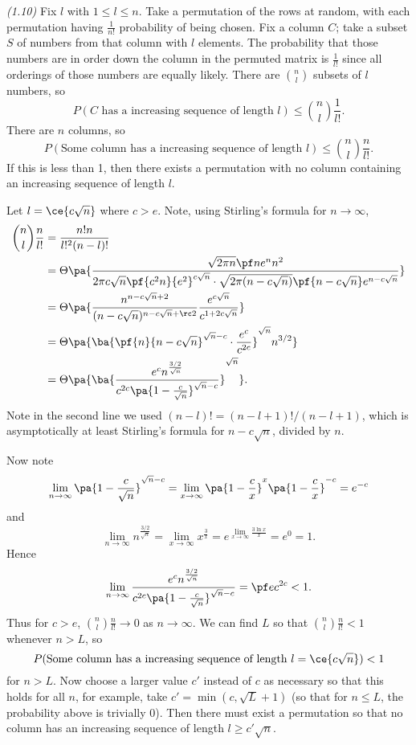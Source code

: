 \begin{problem} {\it (1.10)}
Fix $l$ with $1\leq l\leq n$. Take a permutation of the rows at random, with each permutation having $\frac{1}{n!}$ probability of being chosen. Fix a column $C$; take a subset $S$ of numbers from that column with $l$ elements. The probability that those numbers are in order down the column in the permuted matrix is $\frac{1}{l!}$ since all orderings of those numbers are equally likely. There are $\binom{n}{l}$ subsets of $l$ numbers, so
\[P(C\text{ has a increasing sequence of length }l)\leq \binom{n}{l}\frac{1}{l!}.\]
There are $n$ columns, so
\[P(\text{Some column has a increasing sequence of length }l)\leq \binom{n}{l}\frac{n}{l!}.\]
If this is less than 1, then there exists a permutation with no column containing an increasing sequence of length $l$.

Let $l=\ce{c\sqrt n}$ where $c>e$. Note, using Stirling's formula for $n\to \infty$, 
\begin{align*}
\binom{n}{l}\frac{n}{l!}&=\frac{n!n}{l!^2 (n-l)!}\\
&=\Theta\pa{ \frac{\sqrt{2\pi n}\pf ne^n n^2}{2\pi c\sqrt n\pf{c^2n}{e^2}^{c\sqrt n}\cdot \sqrt{2\pi (n-c\sqrt n)}\pf{n-c\sqrt n}e^{n-c\sqrt n}}}\\
&=\Theta \pa{\frac{n^{n-c\sqrt{n}+2}}{(n-c\sqrt n)^{n-c\sqrt n+\rc 2}} \frac{e^{c\sqrt n}}{c^{1+2c\sqrt n}}}\\
&=\Theta\pa{\ba{\pf{n}{n-c\sqrt n}^{\sqrt n-c}\cdot \frac{e^c}{c^{2c}}}^{\sqrt n} n^{3/2}}\\
&=\Theta\pa{\ba{\frac{e^cn^{\frac{3/2}{\sqrt n}}}{c^{2c}\pa{1-\frac{c}{\sqrt{n}}}^{\sqrt n-c}}}^{\sqrt n}}.
\end{align*}
Note in the second line we used $(n-l)!=(n-l+1)!/(n-l+1)$, which is asymptotically at least Stirling's formula for $n-c\sqrt n$, divided by $n$.

Now note \[\lim_{n\to \infty}\pa{1-\frac{c}{\sqrt{n}}}^{\sqrt n-c}=\lim_{x\to \infty}\pa{1-\frac{c}{x}}^{x}\pa{1-\frac{c}{x}}^{-c}=e^{-c}\]  and \[\lim_{n\to \infty}n^{\frac{3/2}{\sqrt n}}=\lim_{x\to \infty} x^{\frac 3x}=e^{\lim_{x\to\infty} \frac{3\ln x}{x}}=e^0=1.\]
Hence
\[
\lim_{n\to \infty}\frac{e^cn^{\frac{3/2}{\sqrt n}}}{c^{2c}\pa{1-\frac{c}{\sqrt{n}}}^{\sqrt n-c}}
=\pf ec^{2c}<1.
\]
Thus for $c>e$, $\binom{n}{l}\frac{n}{l!}\to 0$ as $n\to \infty$. We can find $L$ so that $\binom{n}{l}\frac{n}{l!}<1$ whenever $n>L$, so
\begin{equation}\label{p1-10-1}
P(\text{Some column has a increasing sequence of length }l=\ce{c\sqrt n})<1
\end{equation}
for $n>L$. 
Now choose a larger value $c'$ instead of $c$ as necessary so that
this holds for all $n$, for example, take $c'=\min(c,\sqrt{L}+1)$ (so that for $n\leq L$, the probability above is trivially 0). Then there must exist a permutation so that no column has an increasing sequence of length $l\geq c'\sqrt{n}$.


\end{problem}
